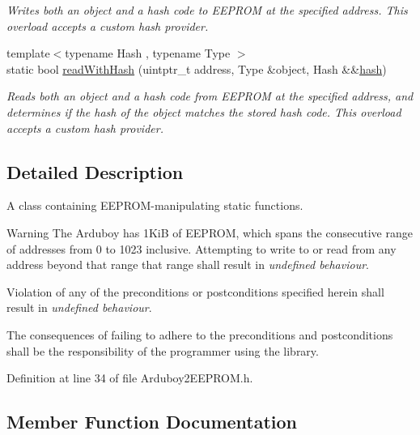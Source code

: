 \begin{DoxyCompactItemize}
\begin{DoxyCompactList}\small\item\em Writes both an object and a hash code to E\+E\+P\+R\+OM at the specified address. This overload accepts a custom hash provider. \end{DoxyCompactList}\item 
{\footnotesize template$<$typename Hash , typename Type $>$ }\\static bool \mbox{\hyperlink{classArduboy2EEPROM_a6b0ef10b0c2f082b2c55a6e002802512}{read\+With\+Hash}} (uintptr\+\_\+t address, Type \&object, Hash \&\&\mbox{\hyperlink{classArduboy2EEPROM_a0d81ac363020a75a0b56af7eb014f5b4}{hash}})
\begin{DoxyCompactList}\small\item\em Reads both an object and a hash code from E\+E\+P\+R\+OM at the specified address, and determines if the hash of the object matches the stored hash code. This overload accepts a custom hash provider. \end{DoxyCompactList}\end{DoxyCompactItemize}


\subsection{Detailed Description}
A {\ttfamily class} containing E\+E\+P\+R\+O\+M-\/manipulating {\ttfamily static} functions. 

\begin{DoxyWarning}{Warning}
The Arduboy has 1KiB of E\+E\+P\+R\+OM, which spans the consecutive range of addresses from 0 to 1023 inclusive. Attempting to write to or read from any address beyond that range that range shall result in {\itshape undefined behaviour}.

Violation of any of the preconditions or postconditions specified herein shall result in {\itshape undefined behaviour}.

The consequences of failing to adhere to the preconditions and postconditions shall be the responsibility of the programmer using the library. 
\end{DoxyWarning}


Definition at line 34 of file Arduboy2\+E\+E\+P\+R\+O\+M.\+h.



\subsection{Member Function Documentation}
\mbox{\label{classArduboy2EEPROM_a4d482ef8e8204c56a0feba68791bc0c8}} 
